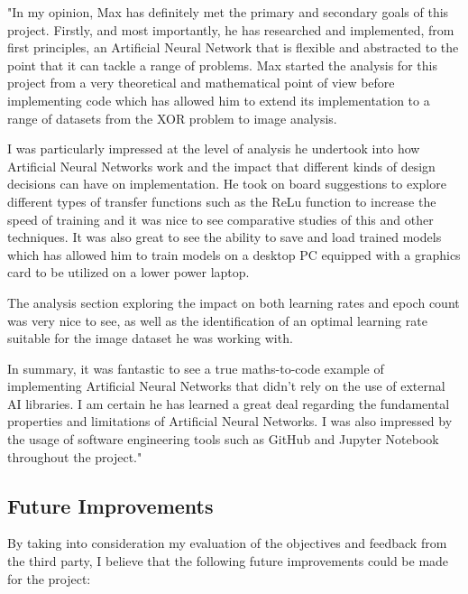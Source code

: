 \documentclass[./project-report/src/latex/project-report.tex]{subfiles}
\begin{document}
\vspace{5mm}

"In my opinion, Max has definitely met the primary and secondary goals of this project. Firstly, and most importantly, he has researched and implemented, from first 
principles, an Artificial Neural Network that is flexible and abstracted to the point that it can tackle a range of problems. Max started the analysis for this 
project from a very theoretical and mathematical point of view before implementing code which has allowed him to extend its implementation to a range of datasets 
from the XOR problem to image analysis.

I was particularly impressed at the level of analysis he undertook into how Artificial Neural Networks work and the impact that different kinds of design decisions can have on 
implementation. He took on board suggestions to explore different types of transfer functions such as the ReLu function to increase the speed of training and it was nice 
to see comparative studies of this and other techniques. It was also great to see the ability to save and load trained models which has allowed him to train models 
on a desktop PC equipped with a graphics card to be utilized on a lower power laptop.

The analysis section exploring the impact on both learning rates and epoch count was very nice to see, as well as the identification of an optimal learning rate 
suitable for the image dataset he was working with.

In summary, it was fantastic to see a true maths-to-code example of implementing Artificial Neural Networks that didn't rely on the use of external AI libraries. I 
am certain he has learned a great deal regarding the fundamental properties and limitations of Artificial Neural Networks. I was also impressed by the usage of 
software engineering tools such as GitHub and Jupyter Notebook throughout the project."

\subsection{Future Improvements}

By taking into consideration my evaluation of the objectives and feedback from the third party, I believe that the following future improvements could be made for the 
project:
\end{document}
